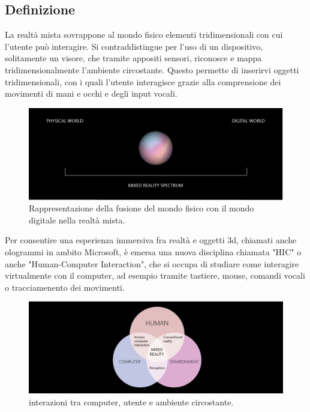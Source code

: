 \subsection{Definizione}
La realtà mista sovrappone al mondo fisico elementi tridimensionali con cui l'utente può interagire. Si contraddistingue per l'uso di un dispositivo, solitamente un visore, che tramite appositi sensori, riconosce e mappa tridimensionalmente l'ambiente circostante. Questo permette di inserirvi oggetti tridimensionali, con i quali l'utente interagisce grazie alla comprensione dei movimenti di mani e occhi e degli input vocali.
\begin{figure}[H]
    \includegraphics[scale=0.4]{figures/chapter_1/mixedrealityspectrum-worlds.png}
    \caption{Rappresentazione della fusione del mondo fisico con il mondo digitale nella realtà mista.}
    \centering
\end{figure}

Per consentire una esperienza immersiva fra realtà e oggetti 3d, chiamati anche ologrammi in ambito Microsoft, è emersa una nuova disciplina chiamata "HIC" o anche "Human-Computer Interaction", che si occupa di studiare come interagire virtualmente con il computer, ad esempio tramite tastiere, mouse, comandi vocali o tracciamenento dei movimenti. \cite{MixedRealityDefinition}

\begin{figure}[H]
    \includegraphics[scale=0.4]{figures/chapter_1/mixed-reality-venn-diagram.png}
    \caption{interazioni tra computer, utente e ambiente circostante.}
    \centering
\end{figure}
    
